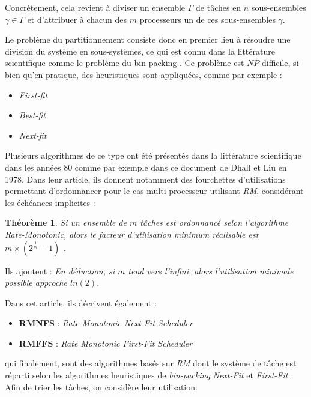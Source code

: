 \documentclass[11pt,a4paper,oneside]{report}
\newtheorem{mytheorem}{Théorème}
\begin{document}
	Concrètement, cela revient à diviser un ensemble $\Gamma$ de tâches en $n$ sous-ensembles 
	$\gamma \in \Gamma$ et d'attribuer à chacun des $m$ processeurs un de ces sous-ensembles $\gamma$.\medskip
	
	
	Le problème du partitionnement consiste donc en premier lieu 
	à résoudre une division du système en sous-systèmes, ce qui est connu dans la 
	littérature scientifique comme le problème du bin-packing \cite{ausiello_approximation_1984}.
	Ce problème est $NP$ difficile, si bien qu'en pratique, 
	des heuristiques sont appliquées, comme par exemple :\medskip
	\begin{itemize}
		\item \textit{First-fit} 
		\item \textit{Best-fit}
		\item \textit{Next-fit}
	\end{itemize}
	
	Plusieurs algorithmes de ce type ont été présentés dans la littérature scientifique
	dans les années 80 comme par exemple \cite{dhall_real-time_1978} dans ce 
	document de Dhall et Liu en 1978. 
	Dans leur article, ils donnent notamment des fourchettes d'utilisations 
	permettant d'ordonnancer pour le cas multi-processeur utilisant \textit{RM}, 
	considérant les échéances implicites :
	\begin{mytheorem}
		\textit{\og Si un ensemble de $m$ tâches est ordonnancé selon l'algorithme \textit{Rate-Monotonic}, 
			alors le facteur d'utilisation minimum réalisable est $m\times(2^{\frac{1}{m}} - 1)$\fg{} .}
	\end{mytheorem}

	Ils ajoutent :\medskip
	\textit{En déduction, si $m$ tend vers l'infini, alors l'utilisation minimale possible approche $ln(2)$.}
	
	Dans cet article, ils décrivent également :\medskip
	\begin{itemize}
		\item \textbf{RMNFS} : \textit{Rate Monotonic Next-Fit Scheduler}
		\item \textbf{RMFFS} : \textit{Rate Monotonic First-Fit Scheduler}
	\end{itemize}
	\vspace{1em}
	qui finalement, sont des algorithmes basés sur \textit{RM} dont le système de tâche est 
	réparti selon les algorithmes heuristiques de \textit{bin-packing} \textit{Next-Fit} et \textit{First-Fit}. 
	Afin de trier les tâches, on considère leur utilisation.
	
\end{document}
